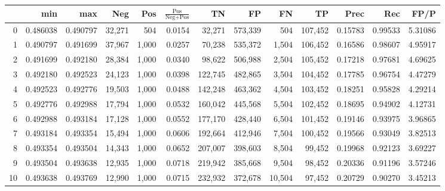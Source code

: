 \begin{tabular}{rrrrrrrrrrrrr}
\toprule
{} &       min &       max &     Neg &    Pos & $\frac{\text{Pos}}{\text{Neg}+\text{Pos}}$ &       TN &       FP &       FN &       TP &     Prec &      Rec &     FP/P \\
\midrule
0   &  0.486038 &  0.490797 &  32,271 &    504 &                                     0.0154 &   32,271 &  573,339 &      504 &  107,452 &  0.15783 &  0.99533 &  5.31086 \\
1   &  0.490797 &  0.491699 &  37,967 &  1,000 &                                     0.0257 &   70,238 &  535,372 &    1,504 &  106,452 &  0.16586 &  0.98607 &  4.95917 \\
2   &  0.491699 &  0.492180 &  28,384 &  1,000 &                                     0.0340 &   98,622 &  506,988 &    2,504 &  105,452 &  0.17218 &  0.97681 &  4.69625 \\
3   &  0.492180 &  0.492523 &  24,123 &  1,000 &                                     0.0398 &  122,745 &  482,865 &    3,504 &  104,452 &  0.17785 &  0.96754 &  4.47279 \\
4   &  0.492523 &  0.492776 &  19,503 &  1,000 &                                     0.0488 &  142,248 &  463,362 &    4,504 &  103,452 &  0.18251 &  0.95828 &  4.29214 \\
5   &  0.492776 &  0.492988 &  17,794 &  1,000 &                                     0.0532 &  160,042 &  445,568 &    5,504 &  102,452 &  0.18695 &  0.94902 &  4.12731 \\
6   &  0.492988 &  0.493184 &  17,128 &  1,000 &                                     0.0552 &  177,170 &  428,440 &    6,504 &  101,452 &  0.19146 &  0.93975 &  3.96865 \\
7   &  0.493184 &  0.493354 &  15,494 &  1,000 &                                     0.0606 &  192,664 &  412,946 &    7,504 &  100,452 &  0.19566 &  0.93049 &  3.82513 \\
8   &  0.493354 &  0.493504 &  14,343 &  1,000 &                                     0.0652 &  207,007 &  398,603 &    8,504 &   99,452 &  0.19968 &  0.92123 &  3.69227 \\
9   &  0.493504 &  0.493638 &  12,935 &  1,000 &                                     0.0718 &  219,942 &  385,668 &    9,504 &   98,452 &  0.20336 &  0.91196 &  3.57246 \\
10  &  0.493638 &  0.493769 &  12,990 &  1,000 &                                     0.0715 &  232,932 &  372,678 &   10,504 &   97,452 &  0.20729 &  0.90270 &  3.45213 \\

\end{tabular}
